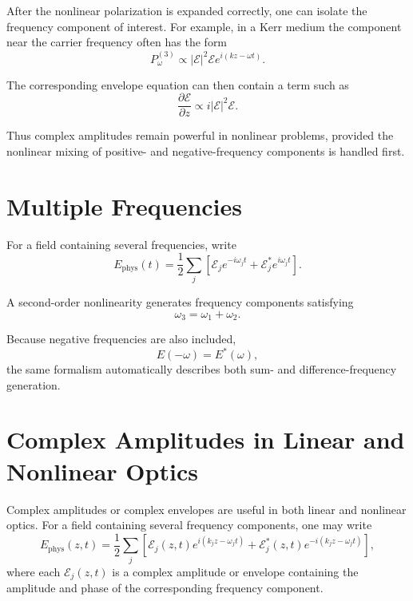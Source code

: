 \documentclass[11pt]{article}
\begin{document}
After the nonlinear polarization is expanded correctly, one can isolate the frequency component of interest. For example, in a Kerr medium the component near the carrier frequency often has the form
\begin{equation}
P^{(3)}_{\omega}
\propto
|\mathcal{E}|^2\mathcal{E}
e^{i(kz-\omega t)}.
\end{equation}

The corresponding envelope equation can then contain a term such as
\begin{equation}
\frac{\partial \mathcal{E}}{\partial z}
\propto
i|\mathcal{E}|^2\mathcal{E}.
\end{equation}

Thus complex amplitudes remain powerful in nonlinear problems, provided the nonlinear mixing of positive- and negative-frequency components is handled first.

\section{Multiple Frequencies}

For a field containing several frequencies, write
\begin{equation}
E_{\mathrm{phys}}(t)
=
\frac{1}{2}
\sum_j
\left[
\mathcal{E}_j e^{-i\omega_j t}
+
\mathcal{E}_j^{*}e^{i\omega_j t}
\right].
\end{equation}

A second-order nonlinearity generates frequency components satisfying
\begin{equation}
\omega_3=\omega_1+\omega_2.
\end{equation}

Because negative frequencies are also included,
\begin{equation}
E(-\omega)=E^{*}(\omega),
\end{equation}
the same formalism automatically describes both sum- and difference-frequency generation.

\section{Complex Amplitudes in Linear and Nonlinear Optics}

Complex amplitudes or complex envelopes are useful in both linear and nonlinear optics.  For a field containing several frequency components, one may write
\begin{equation}
E_{\mathrm{phys}}(z,t)
=
\frac{1}{2}
\sum_j
\left[
\mathcal{E}_j(z,t)e^{i(k_j z-\omega_j t)}
+
\mathcal{E}_j^{*}(z,t)e^{-i(k_j z-\omega_j t)}
\right],
\end{equation}
where each \(\mathcal{E}_j(z,t)\) is a complex amplitude or envelope containing the amplitude and phase of the corresponding frequency component.
\end{document}
